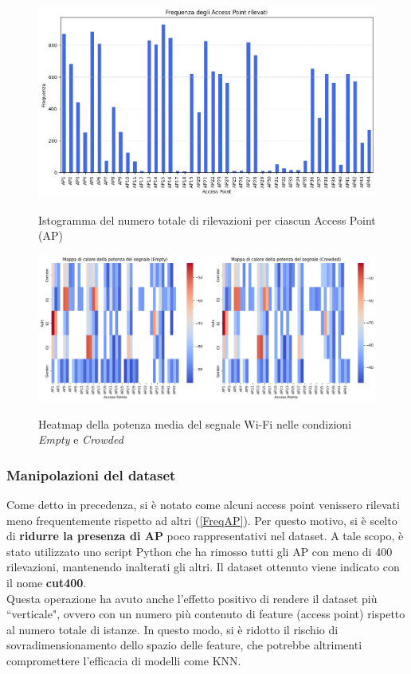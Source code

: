 \documentclass{article}
\begin{document}
\begin{figure}[ht!]
    \centering
    {\includegraphics[scale=0.50]{img/output.png}}
    \caption{Istogramma del numero totale di rilevazioni per ciascun Access Point (AP)}
    \label{FreqAP}
\end{figure}

\begin{figure}[ht!]
    \centering
    {\includegraphics[scale=0.38]{img/ColorMap.png}}
    \caption{Heatmap della potenza media del segnale Wi-Fi nelle condizioni \textit{Empty} e \textit{Crowded}}
    \label{heatmap}
\end{figure}

\subsubsection{Manipolazioni del dataset}
Come detto in precedenza, si è notato come alcuni access point venissero rilevati meno frequentemente rispetto ad altri (\autoref{FreqAP}). Per questo motivo, si è scelto di \textbf{ridurre la presenza di AP} poco rappresentativi nel dataset. A tale scopo, è stato utilizzato uno script Python che ha rimosso tutti gli AP con meno di 400 rilevazioni, mantenendo inalterati gli altri. Il dataset ottenuto viene indicato con il nome \textbf{cut400}.\\
Questa operazione ha avuto anche l’effetto positivo di rendere il dataset più “verticale", ovvero con un numero più contenuto di feature (access point) rispetto al numero totale di istanze. In questo modo, si è ridotto il rischio di sovradimensionamento dello spazio delle feature, che potrebbe altrimenti compromettere l'efficacia di modelli come KNN. \\
\end{document}
